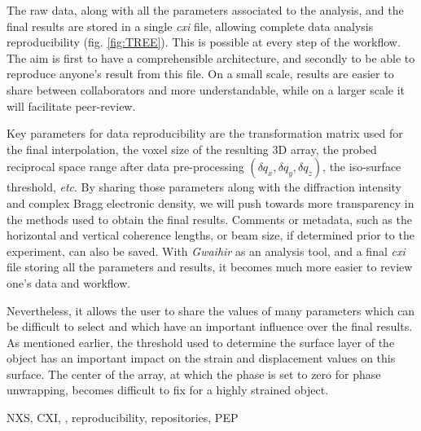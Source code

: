 The raw data, along with all the parameters associated to the analysis, and the final results are stored in a single \textit{cxi} file, allowing complete data analysis reproducibility (fig. \ref{fig:TREE}). This is possible at every step of the workflow. The aim is first to have a comprehensible architecture, and secondly to be able to reproduce anyone's result from this file. On a small scale, results are easier to share between collaborators and more understandable, while on a larger scale it will facilitate peer-review.

Key parameters for data reproducibility are the transformation matrix used for the final interpolation, the voxel size of the resulting 3D array, the probed reciprocal space range after data pre-processing $(\delta q_x , \delta q_y , \delta q_z)$, the iso-surface threshold, \textit{etc}. By sharing those parameters along with the diffraction intensity and complex Bragg electronic density, we will push towards more transparency in the methods used to obtain the final results.
Comments or metadata, such as the horizontal and vertical coherence lengths, or beam size, if determined prior to the experiment, can also be saved.
With \textit{Gwaihir} as an analysis tool, and a final \textit{cxi} file storing all the parameters and results, it becomes much more easier to review one's data and workflow.

Nevertheless, it allows the user to share the values of many parameters which can be difficult to select and which have an important influence over the final results. As mentioned earlier, the threshold used to determine the surface layer of the object has an important impact on the strain and displacement values on this surface. The center of the array, at which the phase is set to zero for phase unwrapping, becomes difficult to fix for a highly strained object.

\textcolor{Important}{
NXS, CXI, , reproducibility, repositories, PEP
}